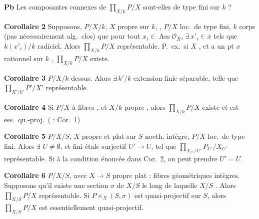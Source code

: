 \documentclass[11pt,a4paper]{article}
\begin{document}
\textbf{Pb} Les composantes connexes de $\prod_{X/k} P/X$ \struck{\ill{}} sont-elles
de type fini sur $k$ ?

\textbf{Corollaire 2} Supposons,  $P/X/k$, $X$ propre sur $k$,
\struck{\ill{} \ill{}}, $P/X$ loc.\ de type fini, $k$ corps
(pas nécessairement alg.\ clos) que pour tout $x_i \in \operatorname{Ass}\mathcal{O}_X$,
$\exists\, x'_i \in \bar{x}$ tels que $k(x'_i)/k$ radiciel.
Alors $\prod_{X/k} P/X$ représentable. P.\ ex.\ si $X$
\struck{\ill{}}  \struck{\ill{} \ill{}} 
, et a un pt $x$
rationnel sur $k$ \struck{\ill{}}, $\prod_{X/k} P/X$ existe.

\textbf{Corollaire 3} $P/X/k$  dessus. Alors
$\exists\, k'/k$ extension finie séparable, telle que
$\prod_{X'/k'} P'/X'$ représentable.

\textbf{Corollaire 4} Si $P/X$ à fibres , et
$X/k$ propre \struck{\ill{}}, alors $\prod_{X/k} P/X$ existe et est
ess.\ qu.-proj.\ ( : Cor.\ 1) \struck{\ill{}}

\textbf{Corollaire 5} $P/X/S$, $X$ propre et plat sur $S$ noeth.
intègre, $P/X$ loc.\ de type fini. Alors $\exists$
  $U \neq \emptyset$, et
 fini étale surjectif $U' \to U$, tel que
$\prod_{X_{U'}/U'} P_{U'}/X_{U'}$ représentable.
Si   à la condition
énoncée dans Cor.\ 2, on peut prendre $U' = U$.


\textbf{Corollaire 6} $P/X/S$, avec $X \to S$ propre plat :
fibres géométriques intègres. Supposons qu'il existe une section $\sigma$ de
$X/S$ 
le long de laquelle
$X/S$  \struck{\ill{}} . Alors $\prod_{X/S} P/X$
représentable. Si $P \times_X (S,\sigma)$ est quasi-projectif
sur $S$, alors $\prod_{X/S} P/X$ est essentiellement quasi-projectif.
\end{document}
